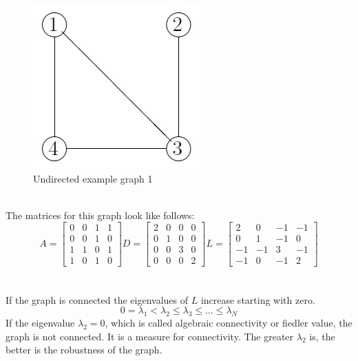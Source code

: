 \documentclass[12pt]{report}
\begin{document}
\begin{figure}[h]
\centering
\includegraphics[scale=.6]{graph}
\caption{Undirected example graph 1}
\label{FIG:abb3}
\end{figure}
\\
\noindent The matrices for this graph look like follows:\\
\begin{equation}
A= \left[ \begin{array}{rrrr}
			0 & 0 & 1 & 1 \\
			0 & 0 & 1 & 0 \\
			1 & 1 & 0 & 1 \\
			1 & 0 & 1 & 0
			\end{array} \right]
D= \left[ \begin{array}{rrrr}
			2 & 0 & 0 & 0 \\
			0 & 1 & 0 & 0 \\
			0 & 0 & 3 & 0 \\
			0 & 0 & 0 & 2
			\end{array} \right] 
L= \left[ \begin{array}{rrrr}
			2 & 0 & -1 & -1 \\
			0 & 1 & -1 & 0 \\
			-1 & -1 & 3 & -1 \\
			-1 & 0 & -1 & 2
			\end{array} \right]
			\label{EQ:gleichung5}
\end{equation}
\\
\\
If the graph is connected the eigenvalues of $ L $ increase starting with zero.\\
\begin{equation}
0=\lambda_1<\lambda_2\le\lambda_3\le\dots\le\lambda_N
\end{equation}
If the eigenvalue $\lambda_2=0$, which is called algebraic connectivity or fiedler value, the graph is not connected. It is a measure for connectivity. The greater $\lambda_2$ is, the better is the robustness of the graph.\\
\\
\end{document}
